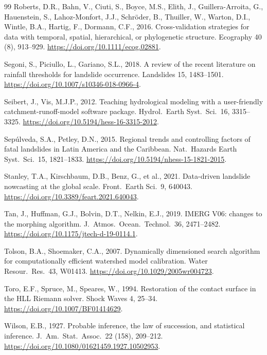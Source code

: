 \documentclass[authoryear,preprint,review,12pt]{elsarticle}
\begin{document}
\begin{thebibliography}{99}
Roberts, D.R., Bahn, V., Ciuti, S., Boyce, M.S., Elith, J., Guillera-Arroita, G.,
Hauenstein, S., Lahoz-Monfort, J.J., Schr\"oder, B., Thuiller, W., Warton, D.I.,
Wintle, B.A., Hartig, F., Dormann, C.F., 2016. Cross-validation strategies for
data with temporal, spatial, hierarchical, or phylogenetic structure. Ecography
40 (8), 913--929. \url{https://doi.org/10.1111/ecog.02881}.

Segoni, S., Piciullo, L., Gariano, S.L., 2018. A review of the recent literature
on rainfall thresholds for landslide occurrence. Landslides 15, 1483--1501.
\url{https://doi.org/10.1007/s10346-018-0966-4}.

Seibert, J., Vis, M.J.P., 2012. Teaching hydrological modeling with a
user-friendly catchment-runoff-model software package. Hydrol.\ Earth Syst.\ Sci.\
16, 3315--3325. \url{https://doi.org/10.5194/hess-16-3315-2012}.

Sep\'ulveda, S.A., Petley, D.N., 2015. Regional trends and controlling factors of
fatal landslides in Latin America and the Caribbean. Nat.\ Hazards Earth Syst.\
Sci.\ 15, 1821--1833. \url{https://doi.org/10.5194/nhess-15-1821-2015}.

\bibitem[Stanley et al.(2021)]{stanley2021}
Stanley, T.A., Kirschbaum, D.B., Benz, G., et al., 2021. Data-driven landslide
nowcasting at the global scale. Front.\ Earth Sci.\ 9, 640043.
\url{https://doi.org/10.3389/feart.2021.640043}.

Tan, J., Huffman, G.J., Bolvin, D.T., Nelkin, E.J., 2019. IMERG V06: changes to
the morphing algorithm. J.\ Atmos.\ Ocean.\ Technol.\ 36, 2471--2482.
\url{https://doi.org/10.1175/jtech-d-19-0114.1}.

Tolson, B.A., Shoemaker, C.A., 2007. Dynamically dimensioned search algorithm
for computationally efficient watershed model calibration. Water Resour.\ Res.\
43, W01413. \url{https://doi.org/10.1029/2005wr004723}.

\bibitem[Toro et al.(1994)]{toro1994}
Toro, E.F., Spruce, M., Speares, W., 1994. Restoration of the contact surface in
the HLL Riemann solver. Shock Waves 4, 25--34.
\url{https://doi.org/10.1007/BF01414629}.

\bibitem[Wilson(1927)]{wilson1927}
Wilson, E.B., 1927. Probable inference, the law of succession, and statistical
inference. J.\ Am.\ Stat.\ Assoc.\ 22 (158), 209--212.
\url{https://doi.org/10.1080/01621459.1927.10502953}.

\end{thebibliography}
\end{document}

